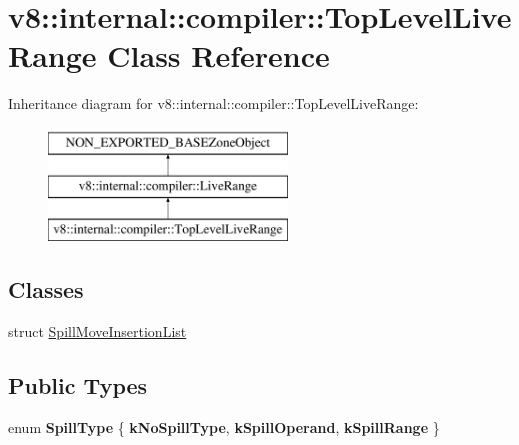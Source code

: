 \hypertarget{classv8_1_1internal_1_1compiler_1_1TopLevelLiveRange}{}\section{v8\+:\+:internal\+:\+:compiler\+:\+:Top\+Level\+Live\+Range Class Reference}
\label{classv8_1_1internal_1_1compiler_1_1TopLevelLiveRange}
Inheritance diagram for v8\+:\+:internal\+:\+:compiler\+:\+:Top\+Level\+Live\+Range\+:\begin{figure}[H]
\begin{center}
\leavevmode
\includegraphics[height=3.000000cm]{classv8_1_1internal_1_1compiler_1_1TopLevelLiveRange}
\end{center}
\end{figure}
\subsection*{Classes}
\begin{DoxyCompactItemize}
\item 
struct \mbox{\hyperlink{structv8_1_1internal_1_1compiler_1_1TopLevelLiveRange_1_1SpillMoveInsertionList}{Spill\+Move\+Insertion\+List}}
\end{DoxyCompactItemize}
\subsection*{Public Types}
\begin{DoxyCompactItemize}
\item 
\mbox{\label{classv8_1_1internal_1_1compiler_1_1TopLevelLiveRange_a3de181c0abbe3c9a93b1423b9553e6cd}} 
enum {\bfseries Spill\+Type} \{ {\bfseries k\+No\+Spill\+Type}, 
{\bfseries k\+Spill\+Operand}, 
{\bfseries k\+Spill\+Range}
 \}
\end{DoxyCompactItemize}
